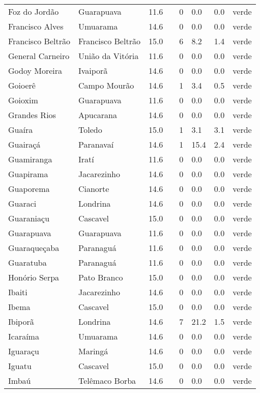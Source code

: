 \begin{longtable}{l|lllllll}
  Foz do Jordão & Guarapuava & 11.6 &  & 0 & 0.0 & 0.0 & verde \\ 
  Francisco Alves & Umuarama & 14.6 &  & 0 & 0.0 & 0.0 & verde \\ 
  Francisco Beltrão & Francisco Beltrão & 15.0 &  & 6 & 8.2 & 1.4 & verde \\ 
  General Carneiro & União da Vitória & 11.6 &  & 0 & 0.0 & 0.0 & verde \\ 
  Godoy Moreira & Ivaiporã & 14.6 &  & 0 & 0.0 & 0.0 & verde \\ 
  Goioerê & Campo Mourão & 14.6 &  & 1 & 3.4 & 0.5 & verde \\ 
  Goioxim & Guarapuava & 11.6 &  & 0 & 0.0 & 0.0 & verde \\ 
  Grandes Rios & Apucarana & 14.6 &  & 0 & 0.0 & 0.0 & verde \\ 
  Guaíra & Toledo & 15.0 &  & 1 & 3.1 & 3.1 & verde \\ 
  Guairaçá & Paranavaí & 14.6 &  & 1 & 15.4 & 2.4 & verde \\ 
  Guamiranga & Iratí & 11.6 &  & 0 & 0.0 & 0.0 & verde \\ 
  Guapirama & Jacarezinho & 14.6 &  & 0 & 0.0 & 0.0 & verde \\ 
  Guaporema & Cianorte & 14.6 &  & 0 & 0.0 & 0.0 & verde \\ 
  Guaraci & Londrina & 14.6 &  & 0 & 0.0 & 0.0 & verde \\ 
  Guaraniaçu & Cascavel & 15.0 &  & 0 & 0.0 & 0.0 & verde \\ 
  Guarapuava & Guarapuava & 11.6 &  & 0 & 0.0 & 0.0 & verde \\ 
  Guaraqueçaba & Paranaguá & 11.6 &  & 0 & 0.0 & 0.0 & verde \\ 
  Guaratuba & Paranaguá & 11.6 &  & 0 & 0.0 & 0.0 & verde \\ 
  Honório Serpa & Pato Branco & 15.0 &  & 0 & 0.0 & 0.0 & verde \\ 
  Ibaiti & Jacarezinho & 14.6 &  & 0 & 0.0 & 0.0 & verde \\ 
  Ibema & Cascavel & 15.0 &  & 0 & 0.0 & 0.0 & verde \\ 
  Ibiporã & Londrina & 14.6 &  & 7 & 21.2 & 1.5 & verde \\ 
  Icaraíma & Umuarama & 14.6 &  & 0 & 0.0 & 0.0 & verde \\ 
  Iguaraçu & Maringá & 14.6 &  & 0 & 0.0 & 0.0 & verde \\ 
  Iguatu & Cascavel & 15.0 &  & 0 & 0.0 & 0.0 & verde \\ 
  Imbaú & Telêmaco Borba & 14.6 &  & 0 & 0.0 & 0.0 & verde \\ 

\end{longtable}
